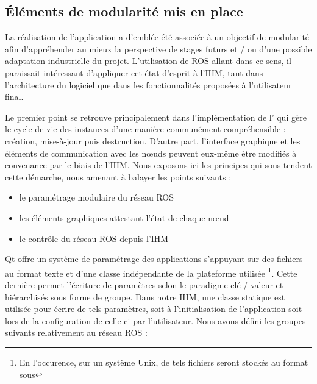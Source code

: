   \subsection{\'{E}léments de modularité mis en place}
  
La réalisation de l'application a d'emblée été associée à un objectif de modularité afin d'appréhender au mieux la perspective de stages futurs et / ou d'une possible adaptation industrielle du projet. 
L'utilisation de ROS allant dans ce sens, il paraissait intéressant d'appliquer cet état d'esprit à l'\gls{IHM}, tant dans l'architecture du logiciel que dans les fonctionnalités proposées à l'utilisateur final. 

Le premier point se retrouve principalement dans l'implémentation de l' qui gère le cycle de vie des instances d'une manière communément compréhensible : création, mise-à-jour puis destruction.  
D'autre part, l'interface graphique et les éléments de communication avec les n\oe{}uds peuvent eux-même être modifiés à convenance par le biais de l'\gls{IHM}. 
Nous exposons ici les principes qui sous-tendent cette démarche, nous amenant à balayer les points suivants : 

\begin{itemize}
  \item le paramétrage modulaire du réseau ROS
  \item les éléments graphiques attestant l'état de chaque n\oe{}ud
  \item le contrôle du réseau ROS depuis l'IHM
\end{itemize}

Qt offre un système de paramétrage des applications s'appuyant sur des fichiers au format texte et d'une classe  indépendante de la plateforme utilisée
\footnote{En l'occurence, sur un système Unix, de tels fichiers seront stockés au format  sous }.
Cette dernière permet l'écriture de paramètres selon le paradigme clé / valeur et hiérarchisés sous forme de groupe.  
Dans notre IHM, une classe statique  est utilisée pour écrire de tels paramètres, soit à l'initialisation de l'application soit lors de la configuration de celle-ci par l'utilisateur. 
Nous avons défini les groupes suivants relativement au réseau ROS :

\renewcommand*\DTstylecomment{\rmfamily\color{red}}

